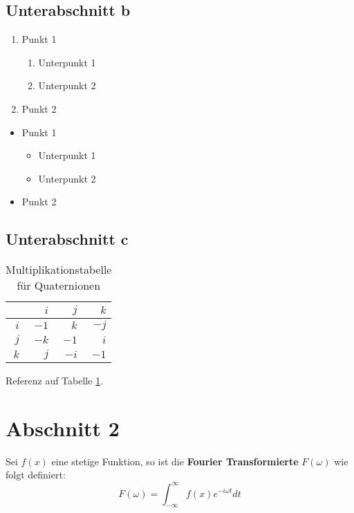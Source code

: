 \subsection{Unterabschnitt b}

\begin{enumerate}
	\item Punkt 1
	\begin{enumerate}
		\item Unterpunkt 1
		\item Unterpunkt 2
	\end{enumerate}
	\item Punkt 2
\end{enumerate}

\begin{itemize}
	\item Punkt 1
	\begin{itemize}
		\item Unterpunkt 1
		\item Unterpunkt 2
	\end{itemize}
	\item Punkt 2
\end{itemize}


\subsection{Unterabschnitt c}

\begin{table}[ht]
	\centering
	\begin{tabular}{r|rrr}
		    & $i$ & $j$ & $k$ \\ \hline
		$i$ &$-1$ & $k$ &$-j$ \\
		$j$ &$-k$ &$-1$ & $i$ \\
		$k$ & $j$ &$-i$ &$-1$
	\end{tabular}
	\caption{
		Multiplikationstabelle für Quaternionen
	}
	\label{table:Quaternions}
\end{table}

Referenz auf Tabelle \ref{table:Quaternions}.

\section{Abschnitt 2}
\label{section:MathematicalStuff}

Sei $f(x)$ eine stetige Funktion, so ist die \textbf{Fourier Transformierte}
$F(\omega)$ wie folgt definiert:
\begin{equation}
\label{equation:FourierDefinition}
	F(\omega) = \int_{-\infty}^{\infty} f(x) e^{-i\omega t} dt
\end{equation}

